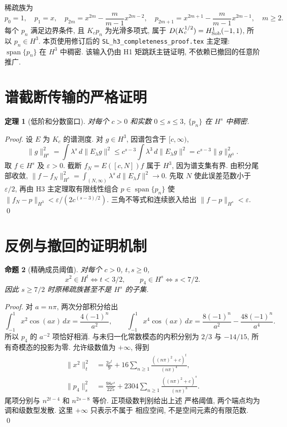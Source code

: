 \documentclass[UTF8]{ctexart}
\newtheorem{theorem}{定理}[section]
\newtheorem{proposition}[theorem]{命题}
\begin{document}
稀疏族为
\[
 p_0=1,\quad p_1=x,\quad
 p_{2m}=x^{2m}-\frac m{m-1}x^{2m-2},\quad
 p_{2m+1}=x^{2m+1}-\frac m{m-1}x^{2m-1},\quad m\ge2.
\]
每个 $p_n$ 满足边界条件, 且 $K_cp_n$ 为光滑多项式, 属于
$D(K_c^{1/2})=H^1_{\rm Sob}(-1,1)$, 所以 $p_n\in H^3$.
本页使用修订后的 \texttt{SL\_h3\_completeness\_proof.tex} 主定理:
$\operatorname{span}\{p_n\}$ 在 $H^3$ 中稠密. 该输入仍由 H1 矩跳跃主链证明,
不依赖已撤回的任意阶推广.

\section{谱截断传输的严格证明}
\begin{theorem}[低阶和分数窗口]\label{thm:main}
对每个 $c>0$ 和实数 $0\le s\le3$, $\{p_n\}$ 在 $H^s$ 中稠密.
\end{theorem}
\begin{proof}
设 $E$ 为 $K_c$ 的谱测度. 对 $g\in H^3$, 因谱包含于 $[c,\infty)$,
\[
 \|g\|_{H^s}^2=\int\lambda^s\,d\|E_\lambda g\|^2
 \le c^{s-3}\int\lambda^3\,d\|E_\lambda g\|^2
 =c^{s-3}\|g\|_{H^3}^2.
\]
取 $f\in H^s$ 及 $\varepsilon>0$. 截断 $f_N=E([c,N])f$ 属于 $H^3$,
因为谱支集有界. 由积分尾部收敛,
$\|f-f_N\|_{H^s}^2=\int_{(N,\infty)}\lambda^s\,d\|E_\lambda f\|^2\to0$.
先取 $N$ 使此误差范数小于 $\varepsilon/2$, 再由 H3 主定理取有限线性组合
$p\in\operatorname{span}\{p_n\}$ 使
$\|f_N-p\|_{H^3}<\varepsilon/(2c^{(s-3)/2})$.
三角不等式和连续嵌入给出 $\|f-p\|_{H^s}<\varepsilon$. \qed
\end{proof}

\section{反例与撤回的证明机制}
\begin{proposition}[精确成员阈值]\label{prop:thresholds}
对每个 $c>0$, $t,s\ge0$,
\[
 x^2\in H^t\iff t<3/2,\qquad p_4\in H^s\iff s<7/2.
\]
因此 $s\ge7/2$ 时原稀疏族甚至不是 $H^s$ 的子集.
\end{proposition}
\begin{proof}
对 $a=n\pi$, 两次分部积分给出
\[
 \int_{-1}^1x^2\cos(ax)\,dx=\frac{4(-1)^n}{a^2},\qquad
 \int_{-1}^1x^4\cos(ax)\,dx
 =\frac{8(-1)^n}{a^2}-\frac{48(-1)^n}{a^4}.
\]
所以 $p_4$ 的 $a^{-2}$ 项恰好相消. 与未归一化常数模态的内积分别为 $2/3$ 与
$-14/15$, 所有奇模态的投影为零. 允许级数值为 $+\infty$, 得到
\begin{align*}
 \|x^2\|_t^2&=\frac{2c^t}{9}
 +16\sum_{n\ge1}\frac{((n\pi)^2+c)^t}{(n\pi)^4},\\
 \|p_4\|_s^2&=\frac{98c^s}{225}
 +2304\sum_{n\ge1}\frac{((n\pi)^2+c)^s}{(n\pi)^8}.
\end{align*}
尾项分别与 $n^{2t-4}$ 和 $n^{2s-8}$ 等价. 正项级数判别给出上述
严格阈值, 两个端点均为调和级数型发散. 这里 $+\infty$ 只表示不属于
相应空间, 不是空间元素的有限范数. \qed
\end{proof}
\end{document}
